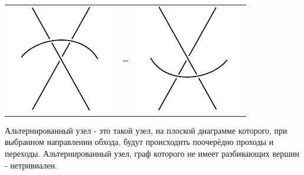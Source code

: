 \begin{tabular}{
>{\centering\arraybackslash}m{3cm}>{\centering\arraybackslash}m{0.4cm}
>{\centering\arraybackslash}m{3cm}
}
\includegraphics{images/over-cross-top.pdf}
&
=
&
\includegraphics{images/over-cross-bottom.pdf}

\end{tabular}

Альтернированный узел - это такой узел, на плоской диаграмме которого, при выбранном направлении обхода, будут происходить поочерёдно проходы и переходы.
Альтернированный узел, граф которого не имеет разбивающих вершин - нетривиален.

